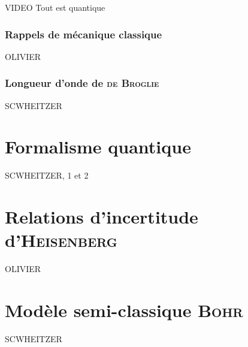 \documentclass[../main/main.tex]{subfiles}
\begin{document}
VIDEO Tout est quantique
\subsubsection{Rappels de mécanique classique}
\label{sssec:rapmeca}
OLIVIER

\subsubsection{Longueur d'onde de \textsc{de Broglie}}
\label{sssec:lgdb}
SCWHEITZER

\section{Formalisme quantique}
\label{sec:formQ}
SCWHEITZER, 1 et 2

\section{Relations d'incertitude d'\textsc{Heisenberg}}
\label{sec:heis}
OLIVIER

\section{Modèle semi-classique \textsc{Bohr}}
\label{sec:bohr}
SCWHEITZER
\end{document}
